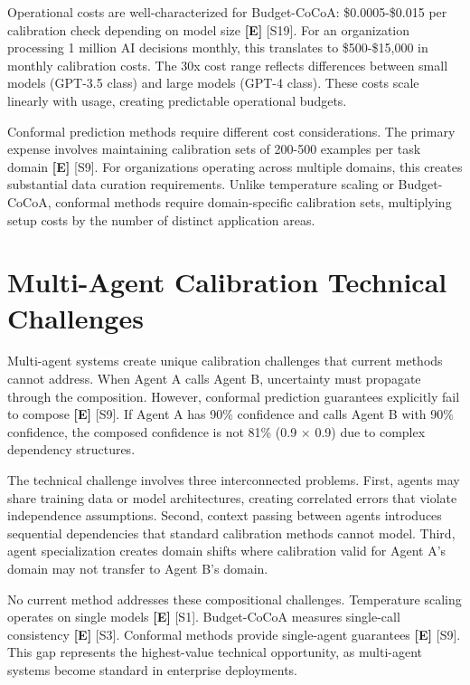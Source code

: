 \documentclass[a4paper,11pt]{article}
\newcommand{\elabel}{\textbf{\textcolor{ecolor}{[E]}}}
\begin{document}
Operational costs are well-characterized for Budget-CoCoA: \$0.0005-\$0.015 per calibration check depending on model size \elabel{} \textcolor{primary}{[S19]}. For an organization processing 1 million AI decisions monthly, this translates to \$500-\$15,000 in monthly calibration costs. The 30x cost range reflects differences between small models (GPT-3.5 class) and large models (GPT-4 class). These costs scale linearly with usage, creating predictable operational budgets.


Conformal prediction methods require different cost considerations. The primary expense involves maintaining calibration sets of 200-500 examples per task domain \elabel{} \textcolor{primary}{[S9]}. For organizations operating across multiple domains, this creates substantial data curation requirements. Unlike temperature scaling or Budget-CoCoA, conformal methods require domain-specific calibration sets, multiplying setup costs by the number of distinct application areas.


\section{Multi-Agent Calibration Technical Challenges}

Multi-agent systems create unique calibration challenges that current methods cannot address. When Agent A calls Agent B, uncertainty must propagate through the composition. However, conformal prediction guarantees explicitly fail to compose \elabel{} \textcolor{primary}{[S9]}. If Agent A has 90\% confidence and calls Agent B with 90\% confidence, the composed confidence is not 81\% (0.9 × 0.9) due to complex dependency structures.


The technical challenge involves three interconnected problems. First, agents may share training data or model architectures, creating correlated errors that violate independence assumptions. Second, context passing between agents introduces sequential dependencies that standard calibration methods cannot model. Third, agent specialization creates domain shifts where calibration valid for Agent A's domain may not transfer to Agent B's domain.


No current method addresses these compositional challenges. Temperature scaling operates on single models \elabel{} \textcolor{primary}{[S1]}. Budget-CoCoA measures single-call consistency \elabel{} \textcolor{primary}{[S3]}. Conformal methods provide single-agent guarantees \elabel{} \textcolor{primary}{[S9]}. This gap represents the highest-value technical opportunity, as multi-agent systems become standard in enterprise deployments.
\end{document}
